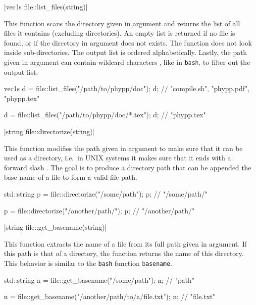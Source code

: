 \funcitem \cppinline|vec1s file::list_files(string)| 

This function scans the directory given in argument and returns the list of all files it contains (excluding directories). An empty list is returned if no file is found, or if the directory in argument does not exists. The function does not look inside sub-directories. The output list is ordered alphabetically. Lastly, the path given in argument can contain wildcard characters \cppinline{*}, like in \texttt{bash}, to filter out the output list.

\begin{example}
\begin{cppcode}
vec1s d = file::list_files("/path/to/phypp/doc");
d; // {"compile.sh", "phypp.pdf", "phypp.tex"}

d = file::list_files("/path/to/phypp/doc/*.tex");
d; // {"phypp.tex"}
\end{cppcode}
\end{example}

\funcitem \vectorfunc \cppinline|string file::directorize(string)| 

This function modifies the path given in argument to make sure that it can be used as a directory, i.e.~in UNIX systems it makes sure that it ends with a forward slash \cppinline{/}. The goal is to produce a directory path that can be appended the base name of a file to form a valid file path.

\begin{example}
\begin{cppcode}
std::string p = file::directorize("/some/path");
p; // "/some/path/"

p = file::directorize("/another/path/");
p; // "/another/path/"
\end{cppcode}
\end{example}

\funcitem \vectorfunc \cppinline|string file::get_basename(string)| 

This function extracts the name of a file from its full path given in argument. If this path is that of a directory, the function returns the name of this directory. This behavior is similar to the \texttt{bash} function \texttt{basename}.

\begin{example}
\begin{cppcode}
std::string n = file::get_basename("/some/path");
n; // "path"

n = file::get_basename("/another/path/to/a/file.txt");
n; // "file.txt"
\end{cppcode}
\end{example}

